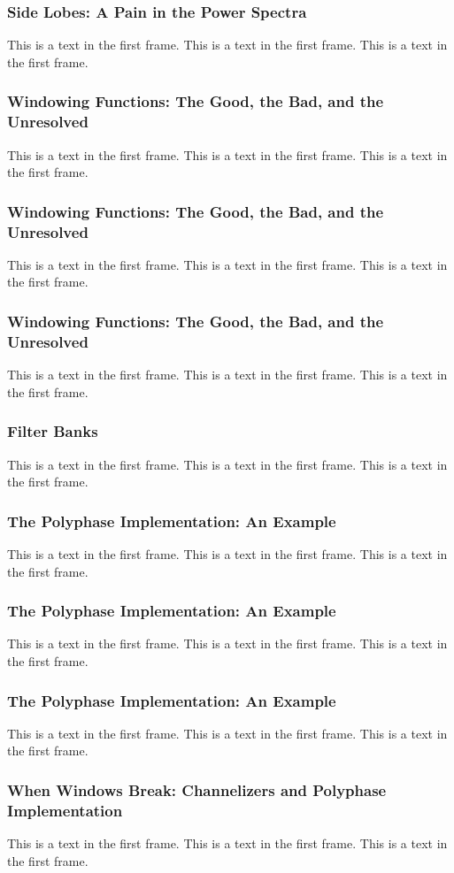 \documentclass{beamer}
\begin{document}
\begin{frame}
\frametitle{Side Lobes: A Pain in the Power Spectra}
This is a text in the first frame. This is a text in the first frame. This is a text in the first frame.
\end{frame}

\begin{frame}
\frametitle{Windowing Functions: The Good, the Bad, and the Unresolved}
This is a text in the first frame. This is a text in the first frame. This is a text in the first frame.
\end{frame}

\begin{frame}
\frametitle{Windowing Functions: The Good, the Bad, and the Unresolved}
This is a text in the first frame. This is a text in the first frame. This is a text in the first frame.
\end{frame}

\begin{frame}
\frametitle{Windowing Functions: The Good, the Bad, and the Unresolved}
This is a text in the first frame. This is a text in the first frame. This is a text in the first frame.
\end{frame}

\begin{frame}
\frametitle{Filter Banks}
This is a text in the first frame. This is a text in the first frame. This is a text in the first frame.
\end{frame}

\begin{frame}
\frametitle{The Polyphase Implementation: An Example}
This is a text in the first frame. This is a text in the first frame. This is a text in the first frame.
\end{frame}

\begin{frame}
\frametitle{The Polyphase Implementation: An Example}
This is a text in the first frame. This is a text in the first frame. This is a text in the first frame.
\end{frame}

\begin{frame}
\frametitle{The Polyphase Implementation: An Example}
This is a text in the first frame. This is a text in the first frame. This is a text in the first frame.
\end{frame}

\begin{frame}
\frametitle{When Windows Break: Channelizers and Polyphase Implementation}
This is a text in the first frame. This is a text in the first frame. This is a text in the first frame.
\end{frame}
\end{document}
